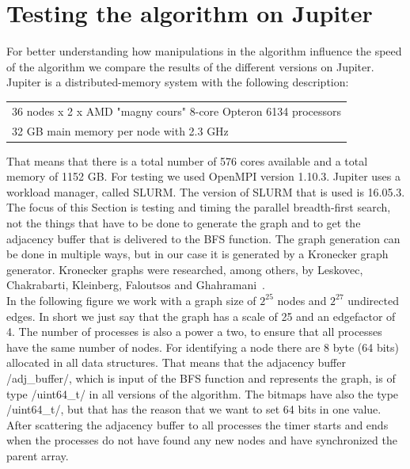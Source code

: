 \documentclass[12pt,a4paper]{article}
\begin{document}
\section{Testing the algorithm on Jupiter}
\label{sec:testing}

For better understanding how manipulations in the algorithm influence the speed of the algorithm we compare the results of the different versions on Jupiter.
Jupiter is a distributed-memory system with the following description:
\begin{flushleft}
\begin{tabular}{| l |}
  \hline
  36 nodes x 2 x AMD "magny cours" 8-core Opteron 6134 processors \\
  32 GB main memory per node with 2.3 GHz\\
  \hline
\end{tabular}
\end{flushleft}
That means that there is a total number of 576 cores available and a total memory of 1152 GB. For testing we used OpenMPI version 1.10.3. Jupiter uses a workload manager, called SLURM. The version of SLURM that is used is 16.05.3.\\
The focus of this Section is testing and timing the parallel breadth-first search, not the things that have to be done to generate the graph and to get the adjacency buffer that is delivered to the BFS function. The graph generation can be done in multiple ways, but in our case it is generated by a Kronecker graph generator. Kronecker graphs were researched, among others, by Leskovec, Chakrabarti, Kleinberg, Faloutsos and Ghahramani~\cite{kronecker}.\\
In the following figure we work with a graph size of \(2^{25}\) nodes and \(2^{27}\) undirected edges. In short we just say that the graph has a scale of 25 and an edgefactor of 4. The number of processes is also a power a two, to ensure that all processes have the same number of nodes. For identifying a node there are 8 byte (64 bits) allocated in all data structures. That means that the adjacency buffer \cinline/adj_buffer/, which is input of the BFS function and represents the graph, is of type \cinline/uint64_t/ in all versions of the algorithm. The bitmaps have also the type \cinline/uint64_t/, but that has the reason that we want to set 64 bits in one value.\\
After scattering the adjacency buffer to all processes the timer starts and ends when the processes do not have found any new nodes and have synchronized the parent array.\\
\end{document}
